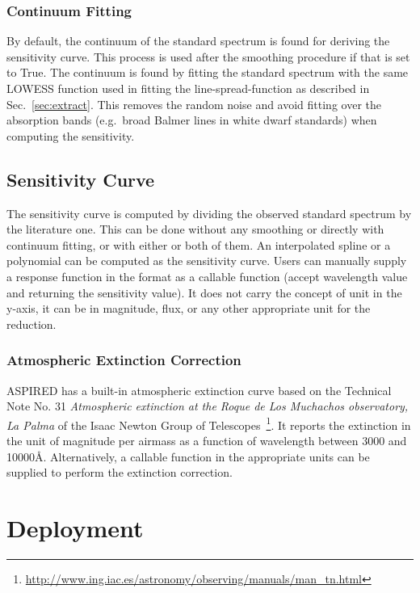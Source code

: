 \documentclass[fleqn,usenatbib]{mnras}
\begin{document}
\subsubsection*{Continuum Fitting}
By default, the continuum of the standard spectrum is found for
deriving the sensitivity curve. This process is used after the
smoothing procedure if that is set to True. The continuum is found
by fitting the standard spectrum with the same LOWESS function
used in fitting the line-spread-function as described in
Sec.~\ref{sec:extract}. This removes the random noise and avoid
fitting over the absorption bands (e.g.\ broad Balmer lines in
white dwarf standards) when computing the sensitivity.

\subsection*{Sensitivity Curve}
The sensitivity curve is computed by dividing the observed standard
spectrum by the literature one. This can be done without any smoothing
or directly with continuum fitting, or with either or both of them.
An interpolated spline or a polynomial can be computed as the
sensitivity curve. Users can manually supply a response function in
the format as a callable function (accept wavelength value and returning the
sensitivity value). It does not carry the concept of unit in the y-axis,
it can be in magnitude, flux, or any other appropriate unit for the
reduction.

\subsubsection*{Atmospheric Extinction Correction}
\textsc{ASPIRED} has a built-in atmospheric extinction curve based on
the Technical Note No. 31 \textit{Atmospheric extinction at the Roque
de Los Muchachos observatory, La Palma} of the Isaac Newton Group of
Telescopes~\footnote{\url{http://www.ing.iac.es/astronomy/observing/manuals/man_tn.html}}.
It reports the extinction in the unit of magnitude per airmass as a
function of wavelength between 3000 and 10000\AA. Alternatively,
a callable function in the appropriate units can be supplied to
perform the extinction correction.

\section{Deployment}

\end{document}
